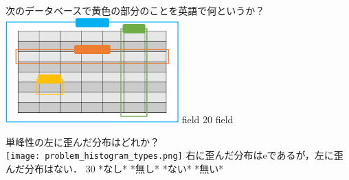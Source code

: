 \begin{quiz}{\MyClass}
\QuizShortAnswer
{
  次のデータベースで黄色の部分のことを英語で何というか？
  \includegraphics[width=0.5\textwidth]{quiz/table_names_quiz.png}
}
{
  field
}
{20}
{field}
{}
{}
{}

\QuizShortAnswer
{
  単峰性の左に歪んだ分布はどれか？\\
  \texttt{[image: problem\_histogram\_types.png]}
}
{
  右に歪んだ分布はeであるが，左に歪んだ分布はない．
}
{30}
{*なし*}
{*無し*}
{*ない*}
{*無い*}

\end{quiz}


